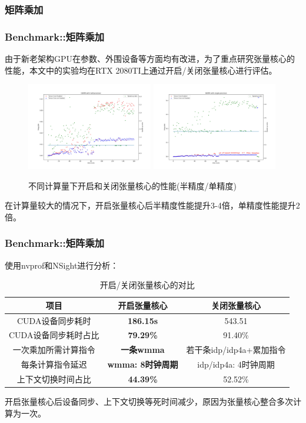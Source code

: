 \documentclass[10pt,aspectratio=169,mathserif]{beamer}
\begin{document}
	\subsubsection{矩阵乘加}
	\begin{frame}
		\frametitle{Benchmark::矩阵乘加}
		由于新老架构GPU在参数、外围设备等方面均有改进，为了重点研究张量核心的性能，本文中的实验均在RTX 2080TI上通过开启/关闭张量核心进行评估。
		\begin{figure}
			\centering
			\includegraphics[width=5.5cm]{figures/GEMM-Half-TF.jpg}
			\includegraphics[width=5.5cm]{figures/GEMM-Single-TF.jpg}
			\caption{不同计算量下开启和关闭张量核心的性能(半精度/单精度)}\label{Fig.GEMM}
		\end{figure}
		在计算量较大的情况下，开启张量核心后半精度性能提升3-4倍，单精度性能提升2倍。
	\end{frame}
	
	\begin{frame}
		\frametitle{Benchmark::矩阵乘加}
		使用nvprof和NSight进行分析：
		\begin{table}
			\centering
			\caption{开启/关闭张量核心的对比}
			\begin{tabular}{ccc}
				\toprule
				项目	&	开启张量核心 & 关闭张量核心\\
				
				\midrule
				CUDA设备同步耗时 & \textbf{186.15s} & 543.51\\
				CUDA设备同步耗时占比 & \textbf{79.29\%} & 91.40\%\\
				一次乘加所需计算指令 & \textbf{一条wmma} & 若干条idp/idp4a+累加指令\\
				每条计算指令延迟 & \textbf{wmma: 8时钟周期} & idp/idp4a: 4时钟周期\\
				上下文切换时间占比 & \textbf{44.39\%} & 52.52\%\\
				\bottomrule
			\end{tabular}
		\end{table}
		开启张量核心后设备同步、上下文切换等死时间减少，原因为张量核心整合多次计算为一次。
	\end{frame}
\end{document}
